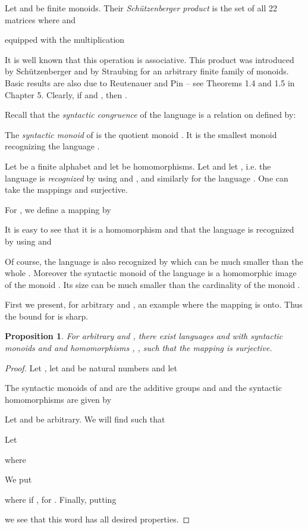 \documentclass[copyright]{eptcs}
\newcounter{theorem}
\newtheorem{proposition}[theorem]{Proposition}
\theoremstyle{definition}
\begin{document}
Let  and  be finite monoids. Their {\it Sch\"utzenberger product}
 is the set of all 22 matrices 
 where
 and

equipped with the multiplication

It is well known that this operation is associative.
This product was introduced by Sch\"utzenberger and by Straubing for
an arbitrary finite family of monoids. Basic results are also due to
Reutenauer and Pin -- see \cite{pi-kniha} Theorems 1.4 and 1.5 in Chapter 5.
Clearly, if  and , then .
\medskip

Recall that the {\it syntactic congruence} of the language 
is a relation  on  defined by:
 
The {\it syntactic monoid} of  is the quotient monoid
. It is the smallest monoid recognizing the language .

Let  be a finite alphabet and let  be homomorphisms. Let  and let , i.e.
the language  is {\it recognized} by  using  and
, and similarly for the language . One can take the mappings
 and  surjective.

For , we define a mapping  by
 

It is easy to see that it is a homomorphism and that the language
 is recognized by  using
 and 
\smallskip

Of course, the language  is also recognized by
 which can be much smaller than the whole  .
Moreover the syntactic monoid of the language  is a homomorphic
image of the monoid . Its size can be much smaller than 
the cardinality of the monoid .
\smallskip

First we present, for arbitrary  and , an example where 
the mapping  is onto. Thus the bound  for 
is sharp.

\begin{proposition}\label{prop-image-sharp} 
For arbitrary  and , there exist languages
  and  with syntactic monoids
 and  and homomorphisms
, , 
such that the mapping 
is surjective.
\end{proposition}


\begin{proof} Let ,
let  and  be natural numbers and let

The syntactic monoids of  and  are the additive groups
 and   and the syntactic homomorphisms are
given by

Let  and
 be arbitrary.
We will find  such that


Let



where

We put




where  if , for .
Finally, putting

we see that this word has all desired properties.
\end{proof}
\end{document}
